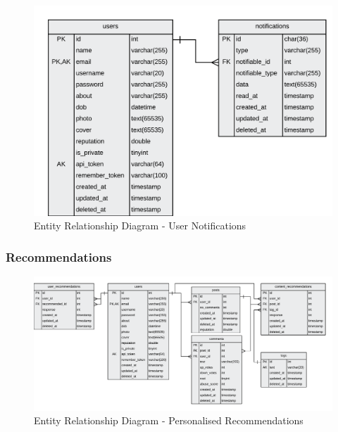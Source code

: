 \begin{figure}[H]
  \centering
  \includegraphics[width=1.0\textwidth]{Images/Design/Database/Notifications}
  \caption{Entity Relationship Diagram - User Notifications} \label{fig:ERD_Notifications}
\end{figure}

\subsubsection{Recommendations}
\begin{figure}[H]
  \centering
  \includegraphics[width=1.0\textwidth]{Images/Design/Database/Recommendations}
  \caption{Entity Relationship Diagram - Personalised Recommendations} \label{fig:ERD_Recommendations}
\end{figure}

